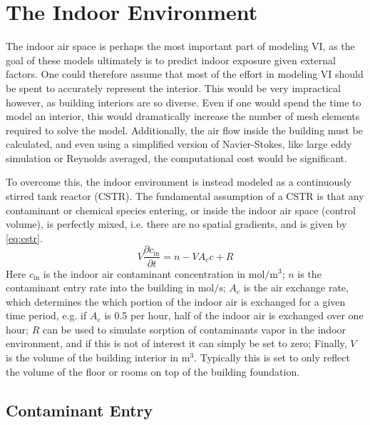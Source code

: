 \section{The Indoor Environment}\label{sec:indoor}

The indoor air space is perhaps the most important part of modeling VI, as the goal of these models ultimately is to predict indoor exposure given external factors.
One could therefore assume that most of the effort in modeling VI should be spent to accurately represent the interior.
This would be very impractical however, as building interiors are so diverse.
Even if one would spend the time to model an interior, this would dramatically increase the number of mesh elements required to solve the model.
Additionally, the air flow inside the building must be calculated, and even using a simplified version of Navier-Stokes, like large eddy simulation or Reynolds averaged, the computational cost would be significant.\par

To overcome this, the indoor environment is instead modeled as a continuously stirred tank reactor (CSTR).
The fundamental assumption of a CSTR is that any contaminant or chemical species entering, or inside the indoor air space (control volume), is perfectly mixed, i.e. there are no spatial gradients, and is given by \eqref{eq:cstr}.
\begin{equation}\label{eq:cstr}
  V\frac{\partial c_\mathrm{in}}{\partial t} = n - V A_e c + R
\end{equation}
Here $c_\mathrm{in}$ is the indoor air contaminant concentration in $\mathrm{mol/m^3}$;
$n$ is the contaminant entry rate into the building in $\mathrm{mol/s}$;
$A_e$ is the air exchange rate, which determines the which portion of the indoor air is exchanged for a given time period, e.g. if $A_e$ is 0.5 per hour, half of the indoor air is exchanged over one hour;
$R$ can be used to simulate sorption of contaminants vapor in the indoor environment, and if this is not of interest it can simply be set to zero;
Finally, $V$ is the volume of the building interior in $\mathrm{m^3}$.
Typically this is set to only reflect the volume of the floor or rooms on top of the building foundation.\par


\subsection{Contaminant Entry}

